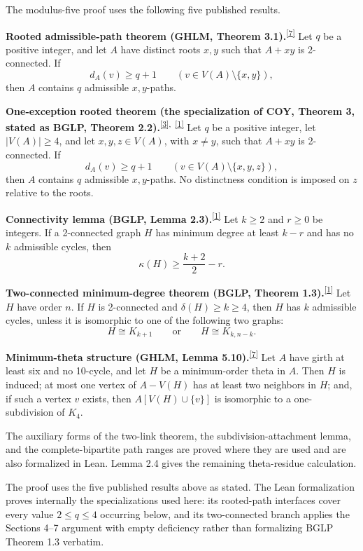 \documentclass[
  11pt]{article}
\begin{document}
The modulus-five proof uses the following five published results.

\textbf{Rooted admissible-path theorem (GHLM, Theorem
3.1).}\textsuperscript{\hyperref[ref-gao-huo-liu-ma-2022]{{[}7{]}}} Let
\(q\) be a positive integer, and let \(A\) have distinct roots \(x,y\)
such that \(A+xy\) is 2-connected. If \[
 d_A(v)\ge q+1\qquad(v\in V(A)\setminus\{x,y\}),
\] then \(A\) contains \(q\) admissible \(x,y\)-paths.

\textbf{One-exception rooted theorem (the specialization of COY, Theorem
3, stated as BGLP, Theorem
2.2).}\textsuperscript{\hyperref[ref-chiba-ota-yamashita-2023]{{[}3{]}},~\hyperref[ref-bglp-2026]{{[}1{]}}}
Let \(q\) be a positive integer, let \(|V(A)|\ge4\), and let
\(x,y,z\in V(A)\), with \(x\ne y\), such that \(A+xy\) is 2-connected.
If \[
 d_A(v)\ge q+1\qquad(v\in V(A)\setminus\{x,y,z\}),
\] then \(A\) contains \(q\) admissible \(x,y\)-paths. No distinctness
condition is imposed on \(z\) relative to the roots.

\textbf{Connectivity lemma (BGLP, Lemma
2.3).}\textsuperscript{\hyperref[ref-bglp-2026]{{[}1{]}}} Let \(k\ge2\)
and \(r\ge0\) be integers. If a 2-connected graph \(H\) has minimum
degree at least \(k-r\) and has no \(k\) admissible cycles, then \[
 \kappa(H)\ge \frac{k+2}{2}-r.
\]

\textbf{Two-connected minimum-degree theorem (BGLP, Theorem
1.3).}\textsuperscript{\hyperref[ref-bglp-2026]{{[}1{]}}} Let \(H\) have
order \(n\). If \(H\) is 2-connected and \(\delta(H)\ge k\ge4\), then
\(H\) has \(k\) admissible cycles, unless it is isomorphic to one of the
following two graphs: \[
 H\cong K_{k+1}
 \qquad\text{or}\qquad
 H\cong K_{k,n-k}.
\]


\textbf{Minimum-theta structure (GHLM, Lemma
5.10).}\textsuperscript{\hyperref[ref-gao-huo-liu-ma-2022]{{[}7{]}}} Let
\(A\) have girth at least six and no 10-cycle, and let \(H\) be a
minimum-order theta in \(A\). Then \(H\) is induced; at most one vertex
of \(A-V(H)\) has at least two neighbors in \(H\); and, if such a vertex
\(v\) exists, then \(A[V(H)\cup\{v\}]\) is isomorphic to a
one-subdivision of \(K_4\).

The auxiliary forms of the two-link theorem, the subdivision-attachment
lemma, and the complete-bipartite path ranges are proved where they are
used and are also formalized in Lean. Lemma 2.4 gives the remaining
theta-residue calculation.

The proof uses the five published results above as stated. The Lean
formalization proves internally the specializations used here: its
rooted-path interfaces cover every value \(2\le q\le4\) occurring below,
and its two-connected branch applies the Sections 4--7 argument with
empty deficiency rather than formalizing BGLP Theorem 1.3 verbatim.
\end{document}
